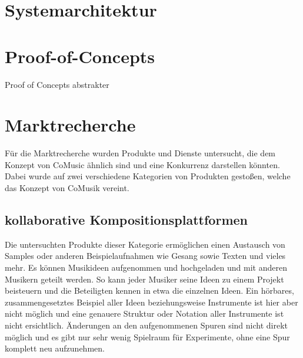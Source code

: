 \documentclass[12pt]{scrartcl}
\begin{document}

\section{Systemarchitektur}







\section{Proof-of-Concepts}

Proof of Concepts abstrakter


\section{Marktrecherche}


Für die Marktrecherche wurden Produkte und Dienste untersucht, die dem Konzept von CoMusic ähnlich sind und eine Konkurrenz darstellen könnten. Dabei wurde auf zwei verschiedene Kategorien von Produkten gestoßen, welche das Konzept von CoMusik vereint.

\subsection{kollaborative Kompositionsplattformen}

Die untersuchten Produkte dieser Kategorie ermöglichen einen Austausch von Samples oder anderen Beispielaufnahmen wie Gesang sowie Texten und vieles mehr. Es können Musikideen aufgenommen und hochgeladen und mit anderen Musikern geteilt werden. So kann jeder Musiker seine Ideen zu einem Projekt beisteuern und die Beteiligten kennen in etwa die einzelnen Ideen. Ein hörbares, zusammengesetztes Beispiel aller Ideen beziehungsweise Instrumente ist hier aber nicht möglich und eine genauere Struktur oder Notation aller Instrumente ist nicht ersichtlich. Änderungen an den aufgenommenen Spuren sind nicht direkt möglich und es gibt nur sehr wenig Spielraum für Experimente, ohne eine Spur komplett neu aufzunehmen.
\end{document}
